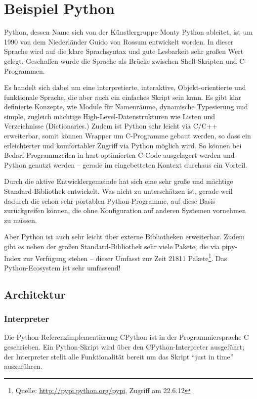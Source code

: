 \section{Beispiel Python}


Python, dessen Name sich von der Künstlergruppe Monty Python ableitet, ist um
1990 von dem Niederländer Guido von Rossum entwickelt worden. In dieser
Sprache wird auf die klare Sprachsyntax und gute Lesbarkeit sehr großen Wert
gelegt. Geschaffen wurde die Sprache als Brücke zwischen Shell-Skripten und
C-Programmen.

Es handelt sich dabei um eine interpretierte, interaktive, Objekt-orientierte
und funktionale Sprache, die aber auch ein einfaches Skript sein kann. Es gibt
klar definierte Konzepte, wie Module für Namenräume, dynamische Typesierung
und simple, zugleich mächtige High-Level-Datenstrukturen wie Listen und
Verzeichnisse (Dictionaries.) Zudem ist Python sehr leicht via C/C++
erweiterbar, somit können Wrapper um C-Programme gebaut werden, so dass ein
erleichterter und komfortabler Zugriff via Python möglich wird. So können bei
Bedarf Programmzeilen in hart optimierten C-Code ausgelagert werden und Python
genutzt werden -- gerade im eingebetteten Kontext durchaus ein Vorteil.

Durch die aktive Entwicklergemeinde hat sich eine sehr große und mächtige
Standard-Bibliothek entwickelt.\cite{pyref-library} Was nicht zu
unterschätzen ist, gerade weil dadurch die schon sehr portablen
Python-Programme, auf diese Basis zurückgreifen können, die ohne Konfiguration
auf anderen Systemen vornehmen zu müssen.

Aber Python ist auch sehr leicht über externe Bibliotheken erweiterbar.
Zudem gibt es neben der großen Standard-Bibliothek sehr viele Pakete, die via
pipy-Index zur Verfügung stehen -- dieser Umfasst zur Zeit 21811
Pakete\footnote{Quelle: \url{http://pypi.python.org/pypi}, Zugriff am 22.6.12}.
Das Python-Ecosystem ist sehr umfassend!


\subsection{Architektur}


\subsubsection{Interpreter}


Die Python-Referenzimplementierung CPython ist in der Programmiersprache C
geschrieben. Ein Python-Skript wird über den CPython-Interpreter ausgeführt;
der Interpreter stellt alle Funktionalität bereit um das Skript “just in time”
auszuführen.

